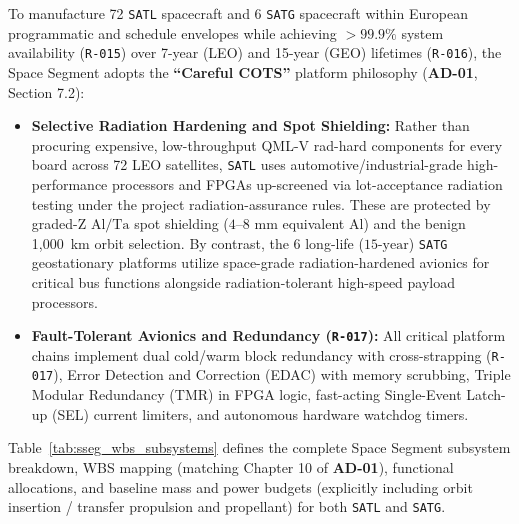 \documentclass[11pt,a4paper]{article}
\providecommand{\abbr}[1]{#1}
\begin{document}
To manufacture 72 \texttt{SATL} spacecraft and 6 \texttt{SATG} spacecraft within European programmatic and schedule envelopes while achieving $> 99.9\%$ system availability (\texttt{R-015}) over 7-year (\abbr{LEO}) and 15-year (\abbr{GEO}) lifetimes (\texttt{R-016}), the Space Segment adopts the \textbf{``Careful \abbr{COTS}''} platform philosophy (\textbf{AD-01}, Section 7.2):
\begin{itemize}
    \item \textbf{Selective Radiation Hardening and Spot Shielding:} Rather than procuring expensive, low-throughput QML-V rad-hard components for every board across 72 \abbr{LEO} satellites, \texttt{SATL} uses automotive/industrial-grade high-performance processors and FPGAs up-screened via lot-acceptance radiation testing under the project radiation-assurance rules. These are protected by graded-Z $\mathrm{Al}/\mathrm{Ta}$ spot shielding ($4\text{--}8\text{ mm}$ equivalent $\mathrm{Al}$) and the benign 1,000~km orbit selection. By contrast, the 6 long-life ($15\text{-year}$) \texttt{SATG} geostationary platforms utilize space-grade radiation-hardened avionics for critical bus functions alongside radiation-tolerant high-speed payload processors.
    \item \textbf{Fault-Tolerant Avionics and Redundancy (\texttt{R-017}):} All critical platform chains implement dual cold/warm block redundancy with cross-strapping (\texttt{R-017}), Error Detection and Correction (\abbr{EDAC}) with memory scrubbing, Triple Modular Redundancy (\abbr{TMR}) in FPGA logic, fast-acting Single-Event Latch-up (\abbr{SEL}) current limiters, and autonomous hardware watchdog timers.
\end{itemize}

Table~\ref{tab:sseg_wbs_subsystems} defines the complete Space Segment subsystem breakdown, WBS mapping (matching Chapter 10 of \textbf{AD-01}), functional allocations, and baseline mass and power budgets (explicitly including orbit insertion / transfer propulsion and propellant) for both \texttt{SATL} and \texttt{SATG}.
\end{document}
